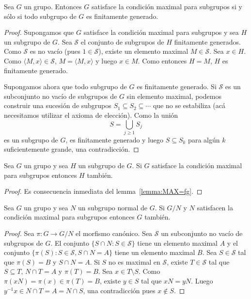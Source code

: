 \begin{lemma}
	\label{lemma:MAX=fg}
	Sea $G$ un grupo. Entonces $G$ satisface la condición maximal para
	subgrupos si y sólo si todo subgrupo de $G$ es finitamente generado.
\end{lemma}

\begin{proof}
	Supongamos que $G$ satisface la condición maximal para subgrupos y sea $H$
	un subgrupo de $G$.  Sea $\mathcal{S}$ el conjunto de subgrupos de $H$
	finitamente generados. Como $\mathcal{S}$ es no vacío (pues
	$1\in\mathcal{S}$), existe un elemento maximal $M\in\mathcal{S}$.  Sea
	$x\in H$. Como $\langle M,x\rangle\in\mathcal{S}$, $M=\langle M,x\rangle$ y
	luego $x\in M$. Como entonces $H=M$, $H$ es finitamente generado.

	Supongamos ahora que todo subgrupo de $G$ es finitamente generado. Si
	$\mathcal{S}$ es un subconjunto no vacío de subgrupos de $G$ sin elemento
	maximal, podemos construir una sucesión de subgrupos $S_1\subseteq
	S_2\subseteq\cdots$ que no se estabiliza (acá necesitamos utilizar el
	axioma de elección). Como la unión 
	\[
		S=\bigcup_{j\geq1}S_j 
	\]
	es un subgrupo de $G$, es finitamente generado y luego $S\subseteq S_k$
	para algún $k$ suficientemente grande, una contradicción.
\end{proof}

\begin{proposition}
	\label{proposition:max:N}
	Sea $G$ un grupo y sea $H$ un subgrupo de $G$.  Si $G$ satisface la
	condición maximal para subgrupos entonces $H$ también. 
\end{proposition}

\begin{proof}
	Es consecuencia inmediata del lemma~\ref{lemma:MAX=fg}.
\end{proof}

\begin{proposition}
	\label{proposition:max:G/N}
	Sea $G$ un grupo y sea $N$ un subgrupo normal de $G$.  Si $G/N$ y $N$
	satisfacen la condición maximal para subgrupos entonces $G$ también. 
\end{proposition}

\begin{proof} 
	Sea $\pi\colon G\to G/N$ el morfismo canónico.  Sea $\mathcal{S}$ un
	subconjunto no vacío de subgrupos de $G$. El conjunto $\{S\cap
	N:S\in\mathcal{S}\}$ tiene un elemento maximal $A$ y el conjunto
	$\{\pi(S):S\in\mathcal{S},S\cap N=A\}$ tiene un elemento maximal $B$. Sea
	$S\in\mathcal{S}$ tal que $\pi(S)=B$ y $S\cap N=A$. Si $S$ no es maximal en
	$\mathcal{S}$, existe $T\in\mathcal{S}$ tal que $S\subseteq T$, $N\cap T=A$
	y $\pi(T)=B$. Sea $x\in T\setminus S$. Como $\pi(xN)=\pi(x)\in\pi(T)=B$,
	existe $y\in S$ tal que $xN=yN$. Luego $y^{-1}x\in N\cap T=A=N\cap S$, una
	contradicción pues $x\not\in S$. 
\end{proof}

